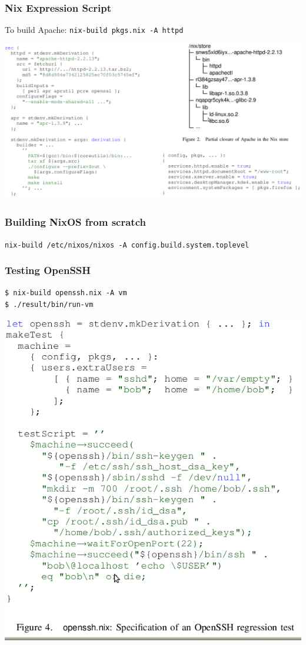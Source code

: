 \documentclass[compress,red]{beamer}
\begin{document}
\frame
{
	\frametitle{Nix Expression Script}
	To build Apache: \texttt{nix-build pkgs.nix -A httpd}
	\begin{center}
	\includegraphics[scale=0.25]{vm-apache.png}
	\end{center}

}

\frame
{
	\frametitle{Building NixOS from scratch}
	\small{\texttt{nix-build /etc/nixos/nixos -A config.build.system.toplevel}}
	\pause
	
}

\frame
{
	\frametitle{Testing OpenSSH}
	\texttt{\$ nix-build openssh.nix -A vm} \\
	\texttt{\$ ./result/bin/run-vm}
	\begin{center}
	\includegraphics[scale=0.25]{vm-openssh.png}
	\end{center}
}
\end{document}
